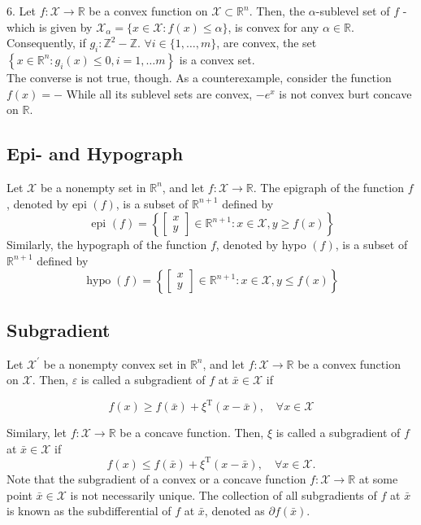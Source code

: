 \documentclass[english]{latex4ei_sheet}
\begin{document}
\begin{sectionbox}
6. Let $f: \mathcal{X} \rightarrow \mathbb{R}$ be a convex function on $\mathcal{X} \subset \mathbb{R}^{n}$. Then, the $\alpha$-sublevel set of $f$ - which is given by $\mathcal{X}_{\alpha}=\{x \in \mathcal{X}: f(x) \leq \alpha\}$, is convex for any $\alpha \in \mathbb{R}$. Consequently, if $g_{i}: \mathbb{Z}^{2}-\mathbb{Z}$. $\forall i \in\{1, \ldots, m\}$, are convex, the set $\left\{x \in \mathbb{R}^{n}: g_{i}(x) \leq 0, i=1, \ldots m\right\}$ is a convex set.\\
The converse is not true, though. As a counterexample, consider the function $f(x)=-$ While all its sublevel sets are convex, $-e^{x}$ is not convex burt concave on $\mathbb{R}$.
\end{sectionbox}
\begin{sectionbox}
\subsection{Epi- and Hypograph}
Let $\mathcal{X}$ be a nonempty set in $\mathbb{R}^{n}$, and let $f: \mathcal{X} \rightarrow \mathbb{R}$. The epigraph of the function $f$, denoted by epi $(f)$, is a subset of $\mathbb{R}^{n+1}$ defined by
$$
\text { epi }(f)=\left\{\left[\begin{array}{l}
	x \\
	y
\end{array}\right] \in \mathbb{R}^{n+1}: x \in \mathcal{X}, y \geq f(x)\right\}
$$
Similarly, the hypograph of the function $f$, denoted by hypo $(f)$, is a subset of $\mathbb{R}^{n+1}$ defined by
$$
\operatorname{hypo}(f)=\left\{\left[\begin{array}{l}
	x \\
	y
\end{array}\right] \in \mathbb{R}^{n+1}: x \in \mathcal{X}, y \leq f(x)\right\}
$$
\end{sectionbox}
\begin{sectionbox}
\subsection{Subgradient}
Let $\mathcal{X}^{\prime}$ be a nonempty convex set in $\mathbb{R}^{n}$, and let $f: \mathcal{X} \rightarrow \mathbb{R}$ be a convex function on $\mathcal{X}$. Then, $\varepsilon$ is called a subgradient of $f$ at $\bar{x} \in \mathcal{X}$ if
\begin{emphbox}
\begin{flushleft}
$$
f(x) \geq f(\bar{x})+\xi^{\mathrm{T}}(x-\bar{x}), \quad \forall x \in \mathcal{X}
$$
\end{flushleft}
\end{emphbox}
Similary, let $f: \mathcal{X} \rightarrow \mathbb{R}$ be a concave function. Then, $\xi$ is called a subgradient of $f$ at $\bar{x} \in \mathcal{X}$ if
$$
f(x) \leq f(\bar{x})+\xi^{\mathrm{T}}(x-\bar{x}), \quad \forall x \in \mathcal{X} .
$$
Note that the subgradient of a convex or a concave function $f: \mathcal{X} \rightarrow \mathbb{R}$ at some point $\bar{x} \in \mathcal{X}$ is not necessarily unique. The collection of all subgradients of $f$ at $\bar{x}$ is known as the subdifferential of $f$ at $\bar{x}$, denoted as $\partial f(\bar{x})$.
\end{sectionbox}
\end{document}

